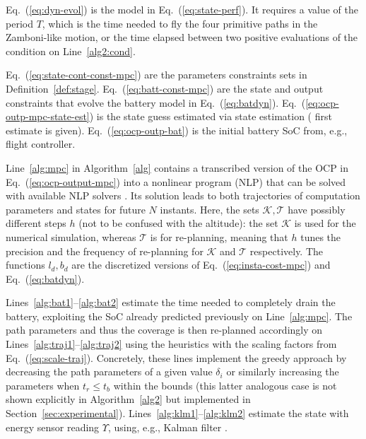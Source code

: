 \documentclass[letterpaper,10pt,journal,twoside]{IEEEtran}
\theoremstyle{definition}
\begin{document}
Eq.~(\ref{eq:dyn-evol}) is the model in Eq.~(\ref{eq:state-perf}). {\color{blue}It} requires a value of the period $T$, which is %
the time needed to fly the four primitive paths in the Zamboni-like motion{\color{blue}, or }%
the time elapsed between two positive evaluations of the condition on Line~\ref{alg2:cond}.

Eq.~(\ref{eq:state-cont-const-mpc}) are the parameters constraints sets in Definition~\ref{def:stage}. Eq.~(\ref{eq:batt-const-mpc}) are the state and output constraints %
that evolve the battery model in Eq.~(\ref{eq:batdyn}). Eq.~(\ref{eq:ocp-outp-mpc-state-est}) is the state guess estimated via state estimation %
(%
first estimate is given). Eq.~(\ref{eq:ocp-outp-bat}) is the initial battery SoC from, e.g., flight controller.

Line~\ref{alg:mpc} in Algorithm~\ref{alg} contains a transcribed version of the OCP in Eq.~(\ref{eq:ocp-output-mpc}) into a nonlinear program (NLP) that can be %
solved with available NLP solvers%
. Its solution leads to both trajectories of {\color{blue} computation} parameters and states for future $N$ instants. Here, the sets $\mathcal{K},\mathcal{T}$ have possibly different steps $h$ (not to be confused with the altitude){\color{blue}: 
the set $\mathcal{K}$ is used for the numerical simulation, whereas $\mathcal{T}$ is for re-planning, meaning that $h$ tunes the precision and the frequency of re-planning for $\mathcal{K}$ and $\mathcal{T}$ respectively.}
The functions $l_d,b_d$ are the discretized versions of Eq.~(\ref{eq:insta-cost-mpc}) and Eq.~(\ref{eq:batdyn}).%

Lines~\ref{alg:bat1}--\ref{alg:bat2} estimate the time needed to completely drain the battery, exploiting the SoC already predicted previously on Line~\ref{alg:mpc}. The {\color{blue}path parameters and thus the} coverage is then re{\color{blue}-}planned accordingly on Lines~\ref{alg:traj1}--\ref{alg:traj2} using {\color{blue} the heuristics with the} %
scaling factors from Eq.~(\ref{eq:scale-traj}). 
{\color{blue} Concretely, these lines implement the greedy approach by decreasing the path parameters of a given value $\delta_i$ or similarly increasing the parameters when $t_r\leq t_b$ within the bounds (this latter analogous case is not shown explicitly in Algorithm~\ref{alg2} but implemented in Section~\ref{sec:experimental})}.
Lines~\ref{alg:klm1}--\ref{alg:klm2} estimate the %
state with %
energy sensor reading $\Upsilon$, {\color{blue}using}, e.g., %
Kalman filter%
.
\end{document}
